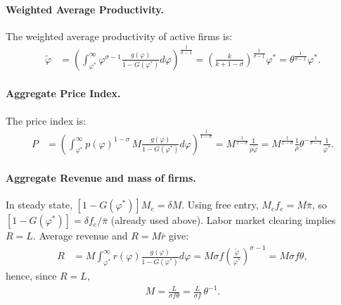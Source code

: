 \begin{solution}
    \paragraph{Weighted Average Productivity.} The weighted average productivity of active firms is:
    \begin{align*}
        \tilde{\varphi} &= \left( \int_{\varphi^*}^{\infty} \varphi^{\sigma - 1} \frac{g(\varphi)}{1 - G(\varphi^*)} d\varphi \right)^{\frac{1}{\sigma - 1}}
        = \left( \frac{k}{k + 1 - \sigma} \right)^{\frac{1}{\sigma - 1}} \varphi^*
        = \theta^{\frac{1}{\sigma-1}}\varphi^* .
    \end{align*}

    \paragraph{Aggregate Price Index.} The price index is:
    \begin{align*}
        P &= \left( \int_{\varphi^*}^{\infty} p(\varphi)^{1 - \sigma} \, M \frac{g(\varphi)}{1 - G(\varphi^*)} d\varphi \right)^{\frac{1}{1 - \sigma}} 
        = M^{\frac{1}{1 - \sigma}} \frac{1}{\rho \tilde{\varphi}}
        = M^{\frac{1}{1 - \sigma}} \frac{1}{\rho} \theta^{-\frac{1}{\sigma-1}}\frac{1}{\varphi^*}.
    \end{align*}

    \paragraph{Aggregate Revenue and mass of firms.} In steady state, $[1-G(\varphi^*)] M_e = \delta M$. Using free entry, $M_e f_e = M\bar{\pi}$, so $[1-G(\varphi^*)] = \delta f_e/\bar{\pi}$ (already used above). Labor market clearing implies $R=L$. Average revenue and $R=M\bar{r}$ give:
    \begin{align*}
        R &= M \int_{\varphi^*}^{\infty} r(\varphi) \frac{g(\varphi)}{1 - G(\varphi^*)} d\varphi 
        = M \sigma f \left(\frac{\tilde{\varphi}}{\varphi^*}\right)^{\sigma - 1}
        = M \sigma f \theta,
    \end{align*}
    hence, since $R=L$,
    \begin{align*}
        M = \frac{L}{\sigma f \theta} = \frac{L}{\sigma f}\,\theta^{-1}.
    \end{align*}


\end{solution}
